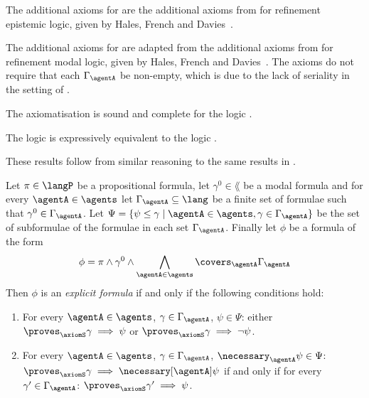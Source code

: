 \documentclass[twoside]{aiml14}
\begin{document}
  The additional axioms for \axiomAamlKFF{} are the additional axioms from \axiomRmlKFF{} for refinement epistemic logic, given by Hales, French and Davies~\cite{hales2012}.
  
  The additional axioms for \axiomAamlKFF{} are adapted from the additional
  axioms from \axiomRmlKD{} for refinement modal logic, given by Hales, French
  and Davies~\cite{hales2012}. The axioms do not require that each
  $\Gamma_\agentA$ be non-empty, which is due to the lack of seriality in the
  setting of \classKFF{}.

  \begin{proposition}
      The axiomatisation \axiomAamlKFF{} is sound and complete for the logic \logicAamlKFF{}.
  \end{proposition}

  \begin{proposition}
      The logic \logicAamlKFF{} is expressively equivalent to the logic \logicKFF{}.
  \end{proposition}

  These results follow from similar reasoning to the same results in \logicAamlK{}.

  \begin{definition}\label{explicit}
      Let $\pi \in \langP$ be a propositional formula,
      let $\gamma^0 \in \lang$ be a modal formula
      and for every $\agentA \in \agents$ 
      let $\Gamma_\agentA \subseteq \lang$ 
      be a finite set of formulae such that $\gamma^0 \in \Gamma_\agentA$.
      Let $\Psi = \{\psi \leq \gamma \mid \agentA \in \agents, \gamma \in \Gamma_\agentA\}$
      be the set of subformulae of the formulae in each set $\Gamma_\agentA$.
      Finally let $\phi$ be a formula of the form
      $$
      \phi = \pi \land \gamma^0 \land \bigwedge_{\agentA \in \agents} \covers_\agentA \Gamma_\agentA
      $$
      Then $\phi$ is an {\em explicit formula} if and only if the following conditions hold:

      \begin{enumerate}
          \item For every $\agentA \in \agents$, $\gamma \in \Gamma_\agentA$, $\psi \in \Psi$: 
              either $\proves_\axiomS \gamma \implies \psi$ or $\proves_\axiomS \gamma \implies \neg \psi$.
          \item For every $\agentA \in \agents$, $\gamma \in \Gamma_\agentA$, $\necessary_\agentA \psi \in \Psi$: 
              $\proves_\axiomS \gamma \implies \necessary[\agentA] \psi$ if and only if 
              for every $\gamma' \in \Gamma_\agentA$: $\proves_\axiomS \gamma' \implies \psi$.
      \end{enumerate}
  \end{definition}
\end{document}
